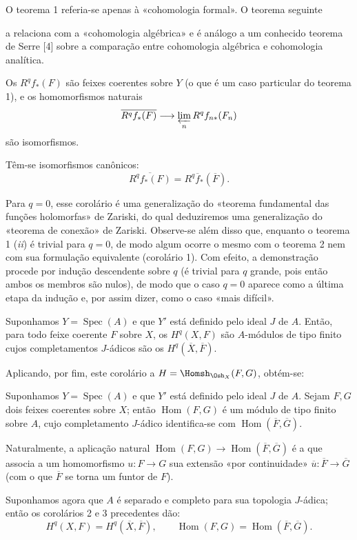 O teorema 1 referia-se apenas à «cohomologia formal». O teorema seguinte

a relaciona com a «cohomologia algébrica» e é análogo a um conhecido teorema
de Serre [4] sobre a comparação entre cohomologia algébrica e cohomologia
analítica.

 Os
$R^{q}f_{*}(F)$ são feixes coerentes sobre $Y$ (o que é um caso particular
do teorema 1), e os homomorfismos naturais
\[
  \overline{R^{q}f_{*}(F)}
  \longrightarrow \varprojlim_n R^{q}f_{n*}(F_n)
\]
são isomorfismos.

 Têm-se isomorfismos canônicos:
\[
  \overline{R^{q}f_{*}(F)}=R^{q}\overline f_{*}(\overline F).
\]

Para $q=0$, esse corolário é uma generalização do «teorema fundamental das
funções holomorfas» de Zariski, do qual deduziremos uma generalização do
«teorema de conexão» de Zariski. Observe-se além disso que, enquanto o teorema 1
(\textit{ii}) é trivial para $q=0$, de modo algum ocorre o mesmo com o
teorema 2 nem com sua formulação equivalente (corolário 1). Com efeito, a
demonstração procede por indução descendente sobre $q$ (é trivial para $q$
grande, pois então ambos os membros são nulos), de modo que o caso $q=0$
aparece como a última etapa da indução e, por assim dizer, como o caso «mais
difícil».

 Suponhamos $Y=\operatorname{Spec}(A)$ e que $Y'$ está
definido pelo ideal $J$ de $A$. Então, para todo feixe coerente $F$ sobre
$X$, os $H^{q}(X,F)$ são $A$-módulos de tipo finito cujos completamentos
$J$-ádicos são os $H^{q}(\overline X,\overline F)$.

Aplicando, por fim, este corolário a
$H=\Homsh_{\Osh_X}(F,G)$, obtém-se:

 Suponhamos $Y=\operatorname{Spec}(A)$ e que $Y'$ está
definido pelo ideal $J$ de $A$. Sejam $F,G$ dois feixes coerentes sobre $X$;
então $\operatorname{Hom}(F,G)$ é um módulo de tipo finito sobre $A$, cujo
completamento $J$-ádico identifica-se com
$\operatorname{Hom}(\overline F,\overline G)$.

Naturalmente, a aplicação natural
$\operatorname{Hom}(F,G)\longrightarrow
\operatorname{Hom}(\overline F,\overline G)$ é a que associa a um
homomorfismo $u:F\longrightarrow G$ sua extensão «por continuidade»
$\overline u:\overline F\longrightarrow\overline G$ (com o que
$\overline F$ se torna um funtor de $F$).

Suponhamos agora que $A$ é separado e completo para sua topologia $J$-ádica;
então os corolários 2 e 3 precedentes dão:
\[
  H^{q}(X,F)=H^{q}(\overline X,\overline F),
  \qquad
  \operatorname{Hom}(F,G)
  =\operatorname{Hom}(\overline F,\overline G).
\]

